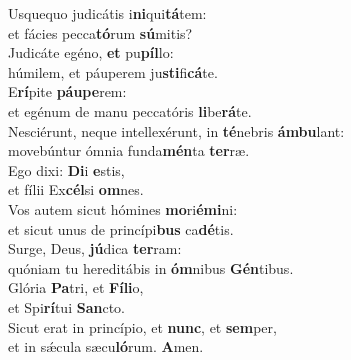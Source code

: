 \evenverse Usquequo judicátis i\textbf{ni}qui\textbf{tá}tem:~\*\\
\evenverse et fácies pecca\textbf{tó}rum \textbf{sú}mitis?\\
\oddverse Judicáte egéno, \textbf{et} pu\textbf{píl}lo:~\*\\
\oddverse húmilem, et páuperem ju\textbf{sti}fi\textbf{cá}te.\\
\evenverse E\textbf{rí}pite \textbf{páu}\textbf{pe}rem:~\*\\
\evenverse et egénum de manu peccatóris \textbf{li}be\textbf{rá}te.\\
\oddverse Nesciérunt, neque intellexérunt, in \textbf{té}nebris \textbf{ám}\textbf{bu}lant:~\*\\
\oddverse movebúntur ómnia funda\textbf{mén}ta \textbf{ter}ræ.\\
\evenverse Ego dixi: \textbf{Di}i \textbf{e}stis,~\*\\
\evenverse et fílii Ex\textbf{cél}si \textbf{om}nes.\\
\oddverse Vos autem sicut hómines \textbf{mo}ri\textbf{é}\textbf{mi}ni:~\*\\
\oddverse et sicut unus de princípi\textbf{bus} ca\textbf{dé}tis.\\
\evenverse Surge, Deus, \textbf{jú}dica \textbf{ter}ram:~\*\\
\evenverse quóniam tu hereditábis in \textbf{óm}nibus \textbf{Gén}tibus.\\
\oddverse Glória \textbf{Pa}tri, et \textbf{Fí}\textbf{li}o,~\*\\
\oddverse et Spi\textbf{rí}tui \textbf{San}cto.\\
\evenverse Sicut erat in princípio, et \textbf{nunc}, et \textbf{sem}per,~\*\\
\evenverse et in sǽcula sæcu\textbf{ló}rum. \textbf{A}men.\\

